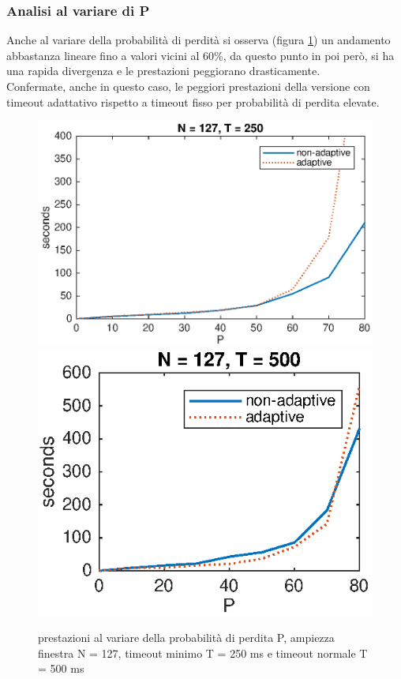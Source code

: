 \subsubsection {Analisi al variare di P}
Anche al variare della probabilità di perdità si osserva (figura \ref{p}) un andamento 
abbastanza lineare fino a valori vicini al 60\%, da questo punto in
poi però, si ha una rapida divergenza e le prestazioni peggiorano
drasticamente.\\
Confermate, anche in questo caso, le peggiori prestazioni della versione
con timeout adattativo rispetto a timeout fisso per probabilità di perdita
elevate.
\begin{figure}[!ht]
	\centering
	\includegraphics[scale=0.8]{images/P_N127_T250}
	\includegraphics[scale=0.8]{images/P_N127_T500}
	\caption{prestazioni al variare della probabilità di perdita P,
			 ampiezza finestra N = 127, timeout minimo T = 250 ms e 
			 timeout normale T = 500 ms}
	\label{p}
\end{figure}
\newpage
